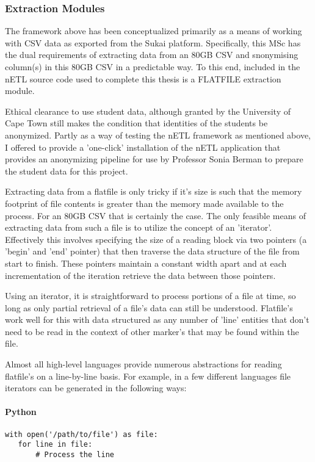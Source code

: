 \subsubsection{Extraction Modules}
The framework above has been conceptualized primarily as a means of working with CSV data as exported from the Sukai platform. Specifically, this MSc has the dual requirements of extracting data from an 80GB CSV and snonymising column(s) in this 80GB CSV in a predictable way. To this end, included in the nETL source code used to complete this thesis is a FLATFILE extraction module.

Ethical clearance to use student data, although granted by the University of Cape Town still makes the condition that identities of the students be anonymized. Partly as a way of testing the nETL framework as mentioned above, I offered to provide a 'one-click' installation of the nETL application that provides an anonymizing pipeline for use by Professor Sonia Berman to prepare the student data for this project.

Extracting data from a flatfile is only tricky if it's size is such that the memory footprint of file contents is greater than the memory made available to the process. For an 80GB CSV that is certainly the case. The only feasible means of extracting data from such a file is to utilize the concept of an 'iterator'. Effectively this involves specifying the size of a reading block via two pointers (a 'begin' and 'end' pointer) that then traverse the data structure of the file from start to finish. These pointers maintain a constant width apart and at each incrementation of the iteration retrieve the data between those pointers.

Using an iterator, it is straightforward to process portions of a file at time, so long as only partial retrieval of a file's data can still be understood. Flatfile's work well for this with data structured as any number of 'line' entities that don't need to be read in the context of other marker's that may be found within the file.

Almost all high-level languages provide numerous abstractions for reading flatfile's on a line-by-line basis. For example, in a few different languages file iterators can be generated in the following ways:

\paragraph*{Python}
\begin{verbatim}
with open('/path/to/file') as file:
   for line in file:
       # Process the line
\end{verbatim}

